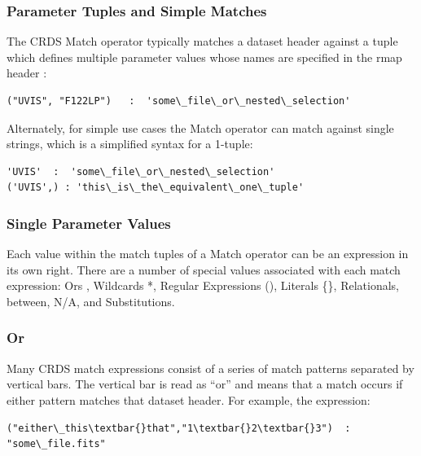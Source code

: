 \documentclass[letterpaper,10pt,english]{sphinxmanual}
\begin{document}
\subsubsection{Parameter Tuples and Simple Matches}
\label{rmap_syntax:parameter-tuples-and-simple-matches}
The CRDS Match operator typically matches a dataset header against a tuple which defines multiple parameter values whose
names are specified in the rmap header :

\begin{Verbatim}[commandchars=\\\{\}]
("UVIS", "F122LP")   :  'some\_file\_or\_nested\_selection'
\end{Verbatim}

Alternately,  for simple use cases the Match operator can match against single
strings,  which is a simplified syntax for a 1-tuple:

\begin{Verbatim}[commandchars=\\\{\}]
'UVIS'  :  'some\_file\_or\_nested\_selection'
('UVIS',) : 'this\_is\_the\_equivalent\_one\_tuple'
\end{Verbatim}


\subsubsection{Single Parameter Values}
\label{rmap_syntax:single-parameter-values}
Each value within the match tuples of a Match operator can be an expression in its own right.   There are a number of
special values associated with each match expression:  Ors \textbar{}, Wildcards *,  Regular Expressions (), Literals \{\},
Relationals, between, N/A, and Substitutions.


\subsubsection{Or \textbar{}}
\label{rmap_syntax:or}
Many CRDS match expressions consist of a series of match patterns separated by vertical bars.   The vertical bar is read
as ``or'' and means that a match occurs if either pattern matches that dataset header.   For example, the expression:

\begin{Verbatim}[commandchars=\\\{\}]
("either\_this\textbar{}that","1\textbar{}2\textbar{}3")  : "some\_file.fits"
\end{Verbatim}
\end{document}
